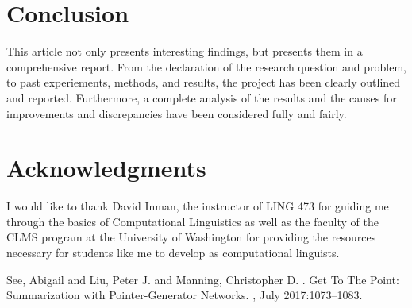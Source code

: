 \documentclass[11pt]{article}
\begin{document}
\section{Conclusion}

This article not only presents interesting findings, but presents them in a comprehensive report. From the declaration of the research question and problem, to past experiements, methods, and results, the project has been clearly outlined and reported. Furthermore, a complete analysis of the results and the causes for improvements and discrepancies have been considered fully and fairly. 

\section*{Acknowledgments}

I would like to thank David Inman, the instructor of LING 473 for guiding me through the basics of Computational Linguistics as well as the faculty of the CLMS program at the University of Washington for providing the resources necessary for students like me to develop as computational linguists.

\begin{thebibliography}{}

See, Abigail  and  Liu, Peter J.  and  Manning, Christopher D.
.
\newblock Get To The Point: Summarization with Pointer-Generator Networks.
,
  July 2017:1073--1083.

\end{thebibliography}
\end{document}
